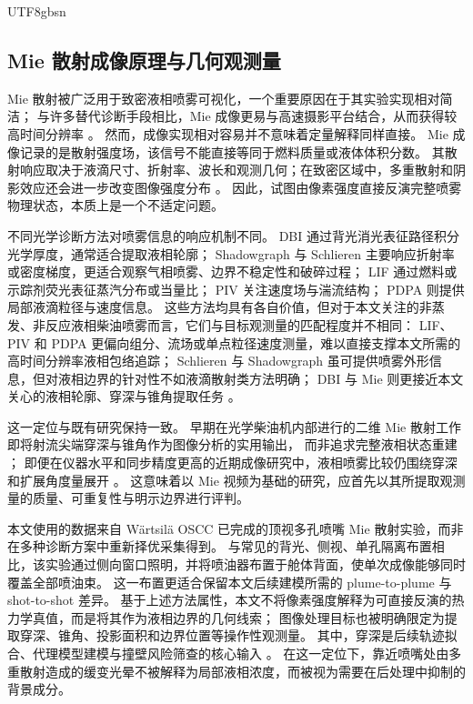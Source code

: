 \documentclass[english, 12pt, a4paper, elec, utf8, a-2b, online]{aaltothesis}
\begin{document}
\begin{CJK*}{UTF8}{gbsn}
\subsection{Mie 散射成像原理与几何观测量}

Mie 散射被广泛用于致密液相喷雾可视化，一个重要原因在于其实验实现相对简洁；
与许多替代诊断手段相比，Mie 成像更易与高速摄影平台结合，从而获得较高时间分辨率 \cite{Linne2013SprayImaging}。
然而，成像实现相对容易并不意味着定量解释同样直接。
Mie 成像记录的是散射强度场，该信号不能直接等同于燃料质量或液体体积分数。
其散射响应取决于液滴尺寸、折射率、波长和观测几何；在致密区域中，多重散射和阴影效应还会进一步改变图像强度分布 \cite{BohrenHuffman2004,Linne2013SprayImaging}。
因此，试图由像素强度直接反演完整喷雾物理状态，本质上是一个不适定问题。

不同光学诊断方法对喷雾信息的响应机制不同。
DBI 通过背光消光表征路径积分光学厚度，通常适合提取液相轮廓；
Shadowgraph 与 Schlieren 主要响应折射率或密度梯度，更适合观察气相喷雾、边界不稳定性和破碎过程；
LIF 通过燃料或示踪剂荧光表征蒸汽分布或当量比；
PIV 关注速度场与湍流结构；
PDPA 则提供局部液滴粒径与速度信息。
这些方法均具有各自价值，但对于本文关注的非蒸发、非反应液相柴油喷雾而言，它们与目标观测量的匹配程度并不相同：
LIF、PIV 和 PDPA 更偏向组分、流场或单点粒径速度测量，难以直接支撑本文所需的高时间分辨率液相包络追踪；
Schlieren 与 Shadowgraph 虽可提供喷雾外形信息，但对液相边界的针对性不如液滴散射类方法明确；
DBI 与 Mie 则更接近本文关心的液相轮廓、穿深与锥角提取任务 \cite{Linne2013SprayImaging}。

这一定位与既有研究保持一致。
早期在光学柴油机内部进行的二维 Mie 散射工作即将射流尖端穿深与锥角作为图像分析的实用输出，
而非追求完整液相状态重建 \cite{MuenchLeipertz1992}；
即便在仪器水平和同步精度更高的近期成像研究中，液相喷雾比较仍围绕穿深和扩展角度量展开 \cite{JungManinSkeenPickett2015}。
这意味着以 Mie 视频为基础的研究，应首先以其所提取观测量的质量、可重复性与明示边界进行评判。

本文使用的数据来自 Wärtsilä OSCC 已完成的顶视多孔喷嘴 Mie 散射实验，而非在多种诊断方案中重新择优采集得到。
与常见的背光、侧视、单孔隔离布置相比，该实验通过侧向窗口照明，并将喷油器布置于舱体背面，使单次成像能够同时覆盖全部喷油束。
这一布置更适合保留本文后续建模所需的 plume-to-plume 与 shot-to-shot 差异。
基于上述方法属性，本文不将像素强度解释为可直接反演的热力学真值，而是将其作为液相边界的几何线索；
图像处理目标也被明确限定为提取穿深、锥角、投影面积和边界位置等操作性观测量。
其中，穿深是后续轨迹拟合、代理模型建模与撞壁风险筛查的核心输入 \cite{Linne2013SprayImaging,LefebvreMcDonell2017,Dent1971Penetration,HiroyasuArai1990,NaberSiebers1996}。
在这一定位下，靠近喷嘴处由多重散射造成的缓变光晕不被解释为局部液相浓度，而被视为需要在后处理中抑制的背景成分。


\end{CJK*}
\end{document}
